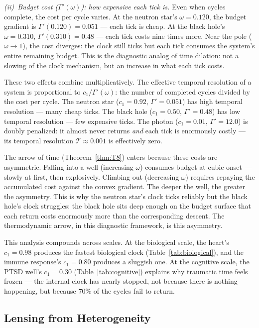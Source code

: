 \documentclass[
  aps,
  prd,
  twocolumn,
  superscriptaddress,
  nofootinbib,
  floatfix
]{revtex4-2}
\newcommand{\Gam}{\Gamma}
\begin{document}
\emph{(ii)~Budget cost ($\Gam'(\omega)$): how expensive
each tick is.}
Even when cycles complete, the cost per cycle varies.
At the neutron star's $\omega = 0.120$, the budget gradient
is $\Gam'(0.120) = 0.051$ --- each tick is cheap.  At the
black hole's $\omega = 0.310$, $\Gam'(0.310) = 0.48$ ---
each tick costs nine times more.  Near the pole
($\omega \to 1$), the cost diverges: the clock still ticks
but each tick consumes the system's entire remaining
budget.  This is the diagnostic analog of time dilation: not
a slowing of the clock mechanism, but an increase in what
each tick costs.

These two effects combine multiplicatively.  The effective
temporal resolution of a system is proportional to
$c_1 / \Gam'(\omega)$: the number of completed cycles
divided by the cost per cycle.  The neutron star
($c_1 = 0.92$, $\Gam' = 0.051$) has high temporal
resolution --- many cheap ticks.  The black hole
($c_1 = 0.50$, $\Gam' = 0.48$) has low temporal
resolution --- few expensive ticks.  The photon
($c_1 = 0.01$, $\Gam' = 12.0$) is doubly penalized: it
almost never returns \emph{and} each tick is enormously
costly --- its temporal resolution $\mathcal{T} \approx 0.001$
is effectively zero.

The arrow of time (Theorem~\ref{thm:T8}) enters because
these costs are asymmetric.  Falling into a well (increasing
$\omega$) consumes budget at cubic onset --- slowly at first,
then explosively.  Climbing out (decreasing $\omega$)
requires repaying the accumulated cost against the convex
gradient.  The deeper the well, the greater the asymmetry.
This is why the neutron star's clock ticks reliably but the
black hole's clock struggles: the black hole sits deep
enough on the budget surface that each return costs
enormously more than the corresponding descent.  The
thermodynamic arrow, in this diagnostic framework, is this
asymmetry.

This analysis compounds across scales.  At the biological
scale, the heart's $c_1 = 0.98$ produces the fastest
biological clock (Table~\ref{tab:biological}), and the
immune response's $c_1 = 0.80$ produces a sluggish one.
At the cognitive scale, the PTSD well's $c_1 = 0.30$
(Table~\ref{tab:cognitive}) explains why traumatic time
feels frozen --- the internal clock has nearly stopped,
not because there is nothing happening, but because $70\%$
of the cycles fail to return.


\subsection{Lensing from Heterogeneity}
\end{document}
